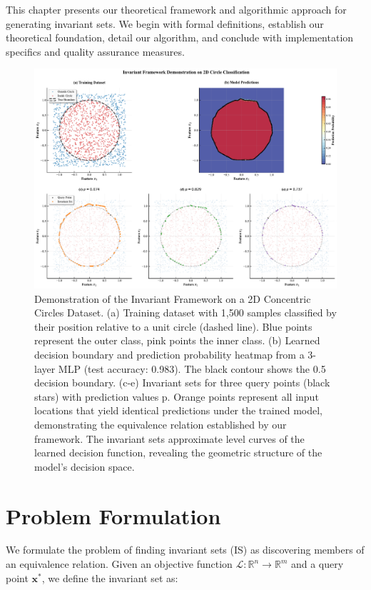 \documentclass[licencjacka,en]{pracamgr}
\begin{document}
This chapter presents our theoretical framework and algorithmic approach for generating invariant sets. We begin with formal definitions, establish our theoretical foundation, detail our algorithm, and conclude with implementation specifics and quality assurance measures.

\begin{figure}[h]
\centering
\includegraphics[width=\linewidth]{figures/main/invariant_framework_combined.pdf}
\caption{Demonstration of the Invariant Framework on a 2D Concentric Circles Dataset.
(a) Training dataset with 1,500 samples classified by their position relative to a unit circle (dashed line). Blue points represent the outer class, pink points the inner class.
(b) Learned decision boundary and prediction probability heatmap from a 3-layer MLP (test accuracy: 0.983). The black contour shows the 0.5 decision boundary.
(c-e) Invariant sets for three query points (black stars) with prediction values p. Orange points represent all input locations that yield identical predictions under the trained model, demonstrating the equivalence relation established by our framework. The invariant sets approximate level curves of the learned decision function, revealing the geometric structure of the model's decision space.}
\label{fig:teaser}
\end{figure}

\section{Problem Formulation}

We formulate the problem of finding invariant sets (IS) as discovering members of an equivalence relation. Given an objective function $\mathcal{L}:\mathbb{R}^n \rightarrow \mathbb{R}^m$ and a query point $\mathbf{x^*}$, we define the invariant set as:
\end{document}

